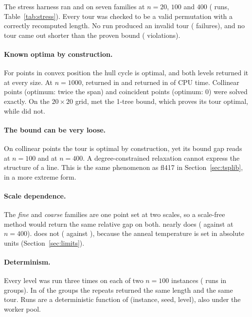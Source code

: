 The stress harness ran  and  on seven families at $n=20$, $100$ and $400$
( runs, Table~\ref{tab:stress}). Every tour was checked to be a valid permutation with
a correctly recomputed length. No run produced an invalid tour ( failures), and no
tour came out shorter than the proven bound ( violations).

\begin{table}[t]
\centering\footnotesize
\caption{Degenerate and known-optimum families. ``Gap to bound'' is listed per $n$ ($20$, $100$, $400$)
and is a ceiling on the true gap. \emph{fine} and \emph{coarse} are the same point set scaled by
$10^{-3}$ and $10^{6}$.}
\label{tab:stress}
\setlength{\tabcolsep}{4pt}

\end{table}

\paragraph{Known optima by construction.}
For points in convex position the hull cycle is optimal, and both levels returned it at every size.
At $n=1000$,  returned  in  and 
returned  in  of CPU time. Collinear points (optimum: twice
the span) and coincident points (optimum: 0) were solved exactly. On the $20\times 20$ grid,
 met the 1-tree bound, which proves its tour optimal, while  did not.

\paragraph{The bound can be very loose.}
On collinear points the tour is optimal by construction, yet its bound gap reads
 at $n=100$ and  at $n=400$. A degree-constrained relaxation cannot express the structure of a line. This
is the same phenomenon as fl417 in Section~\ref{sec:tsplib}, in a more extreme form.

\paragraph{Scale dependence.}
The \emph{fine} and \emph{coarse} families are one point set at two scales, so a scale-free method
would return the same relative gap on both.  nearly does ( against  at
$n=400$).  does not ( against ), because the anneal temperature is set in absolute units (Section~\ref{sec:limits}).

\paragraph{Determinism.}
Every level was run three times on each of two $n=100$ instances ( runs in
 groups). In  of the  groups the repeats
returned the same length and the same tour. Runs are a deterministic function of (instance, seed,
level), also under the worker pool.
